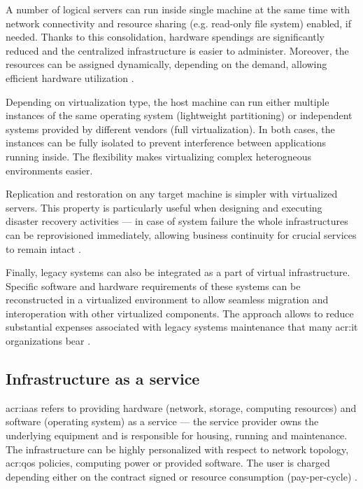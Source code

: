 \documentclass[11pt]{book}
\begin{document}
        A number of logical servers can run inside single machine at the same time with network connectivity and
        resource sharing (e.g. read-only file system) enabled, if needed. Thanks to this consolidation, hardware
        spendings are significantly reduced and the centralized infrastructure is easier to administer. Moreover, the
        resources can be assigned dynamically, depending on the demand, allowing efficient hardware utilization
        \cite{server-consolidation}.

        Depending on virtualization type, the host machine can run either multiple instances of the same operating
        system (lightweight partitioning) or independent systems provided by different vendors (full virtualization).
        In both cases, the instances can be fully isolated to prevent interference between applications running inside.
        The flexibility makes virtualizing complex heterogneous environments easier.

        Replication and restoration on any target machine is simpler with virtualized servers. This property is
        particularly useful when designing and executing disaster recovery activities --- in case of system failure the
        whole infrastructures can be reprovisioned immediately, allowing business continuity for crucial services to
        remain intact \cite{vib}.

        Finally, legacy systems can also be integrated as a part of virtual infrastructure. Specific software and
        hardware requirements of these systems can be reconstructed in a virtualized environment to allow seamless
        migration and interoperation with other virtualized components. The approach allows to reduce substantial
        expenses associated with legacy systems maintenance that many \gls{acr:it} organizations bear \cite{boers}.


      \subsection{Infrastructure as a service}

        \gls{acr:iaas} refers to providing hardware (network, storage, computing resources) and software (operating
        system) as a service --- the service provider owns the underlying equipment and is responsible for housing,
        running and maintenance. The infrastructure can be highly personalized with respect to network topology,
        \gls{acr:qos} policies, computing power or provided software. The user is charged depending either on the
        contract signed or resource consumption (pay-per-cycle) \cite{iaas}.
\end{document}
